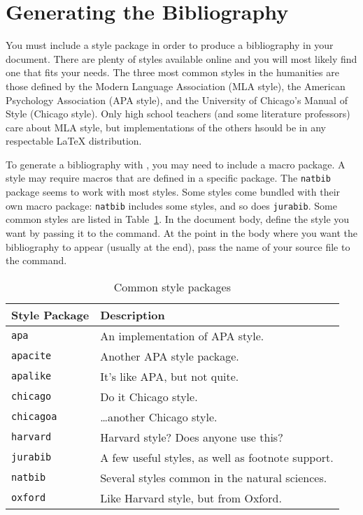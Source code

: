 \section{Generating the Bibliography}
\label{sec:gener-bibl}

You must include a style package in order to produce a bibliography in
your document.  There are plenty of styles available online and you
will most likely find one that fits your needs.  The three most common
styles in the humanities are those defined by the Modern Language
Association (MLA style), the American Psychology Association (APA
style), and the University of Chicago's Manual of Style (Chicago
style).  Only high school teachers (and some literature professors)
care about MLA style, but implementations of the others hsould be in
any respectable \LaTeX{} distribution.

To generate a bibliography with \BibTeX{}, you may need to include a
macro package.  A style may require macros that are defined in a
specific package.  The \texttt{natbib} package seems to work with most
styles.  Some styles come bundled with their own macro package:
\texttt{natbib} includes some styles, and so does \texttt{jurabib}.
Some common styles are listed in Table~\ref{tab:style-packages}.  In
the document body, define the style you want by passing it to the
\verb|| command.  At the point in the body where you
want the bibliography to appear (usually at the end), pass the name of
your source file to the \verb|| command.

\begin{table}
  \centering
  \caption{Common \BibTeX{} style packages}
  \label{tab:style-packages}
  \begin{tabular}{@{}ll@{}}
    \toprule
    Style Package & Description \\
    \midrule
    \texttt{apa} & An implementation of APA style. \\
    \texttt{apacite} & Another APA style package. \\
    \texttt{apalike} & It's like APA, but not quite. \\
    \texttt{chicago} & Do it Chicago style. \\
    \texttt{chicagoa} & \ldots{}another Chicago style. \\
    \texttt{harvard} & Harvard style?  Does anyone use this? \\
    \texttt{jurabib} & A few useful styles, as well as footnote
    support. \\
    \texttt{natbib} & Several styles common in the natural
    sciences. \\
    \texttt{oxford} & Like Harvard style, but from Oxford. \\
    \bottomrule
  \end{tabular}  
\end{table}

